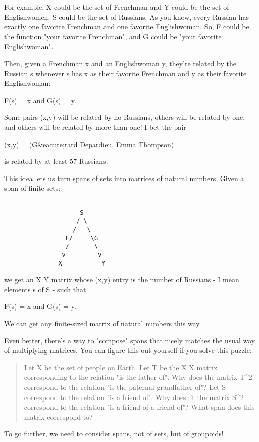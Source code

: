For example, X could be the set of Frenchman and Y could be the set of
Englishwomen.  S could be the set of Russians.  As you know, every
Russian has exactly one favorite Frenchman and one favorite
Englishwoman.  So, F could be the function "your favorite
Frenchman", and G could be "your favorite Englishwoman".

Then, given a Frenchman x and an Englishwoman y, they're related by 
the Russian s whenever s has x as their favorite Frenchman and y as 
their favorite Englishwoman:

F(s) = x  and  G(s) = y.   

Some pairs (x,y) will be related by no Russians, others will be related 
by one, and others will be related by more than one!  I bet the pair

(x,y) = (G&eacute;rard Depardieu, Emma Thompson)

is related by at least 57 Russians.

This idea lets us turn spans of sets into matrices of natural numbers.
Given a span of finite sets:


\begin{verbatim}

                     S
                    / \
                   /   \
                 F/     \G
                 /       \
                v         v 
               X           Y
\end{verbatim}
    
we get an X \times  Y matrix whose (x,y) entry is the number of Russians - 
I mean elements s of S - such that 

F(s) = x  and  G(s) = y.   

We can get any finite-sized matrix of natural numbers this way.  

Even better, there's a way to "compose" spans that nicely matches the
usual way of multiplying matrices.  You can figure this out yourself if
you solve this puzzle:

\begin{quote}
 Let X be the set of people on Earth.  Let T be the X \times  X matrix
 corresponding to the relation "is the father of".  Why does
 the matrix T^{2} correspond to the relation "is the paternal
grandfather of"?  Let S correspond to the relation "is a friend
 of".  Why doesn't the matrix S^{2} correspond to the
 relation "is a friend of a friend of"?  What span does this
 matrix correspond to?  \end{quote}

To go further, we need to consider spans, not of sets, but of groupoids!

